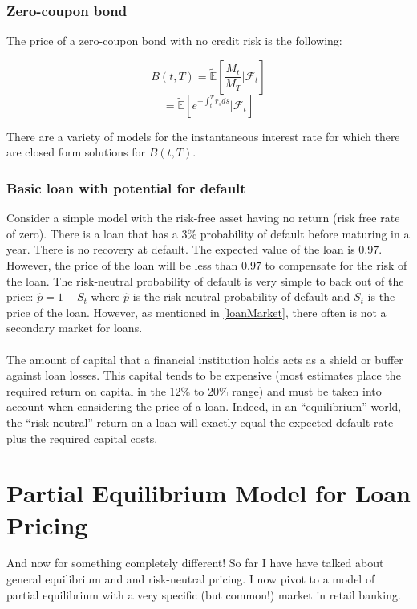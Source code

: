 \documentclass{article}
\theoremstyle{definition}
\begin{document}
\subsubsection{Zero-coupon bond}
The price of a zero-coupon bond with no credit risk is the following:

\[B(t, T)=\mathbb{\tilde{E}}\left[\frac{M_t}{M_T}|\mathcal{F}_t\right]\]
\[=\mathbb{\tilde{E}}\left[e^{-\int_t ^ T r_s ds}|\mathcal{F}_t\right]\]

There are a variety of models for the instantaneous interest rate for which there are closed form solutions for \(B(t, T)\).  

\subsubsection{Basic loan with potential for default}
Consider a simple model with the risk-free asset having no return (risk free rate of zero). There is a loan that has a \(3\%\) probability of default before maturing in a year.  There is no recovery at default.  The expected value of the loan is \(0.97\).  However, the price of the loan will be less than \(0.97\) to compensate for the risk of the loan.  The risk-neutral probability of default is very simple to back out of the price: \(\hat{p}=1-S_t\) where \(\hat{p}\) is the risk-neutral probability of default and \(S_t\) is the price of the loan.  However, as mentioned in \ref{loanMarket}, there often is not a secondary market for loans.  
\\
\\
The amount of capital that a financial institution holds acts as a shield or buffer against loan losses.  This capital tends to be expensive (most estimates place the required return on capital in the 12\% to 20\% range) and must be taken into account when considering the price of a loan.  Indeed, in an ``equilibrium'' world, the ``risk-neutral'' return on a loan will exactly equal the expected default rate plus the required capital costs.
\section{Partial Equilibrium Model for Loan Pricing}

And now for something completely different!  So far I have have talked about general equilibrium and and risk-neutral pricing.  I now pivot to a model of partial equilibrium with a very specific (but common!) market in retail banking.  
\end{document}
